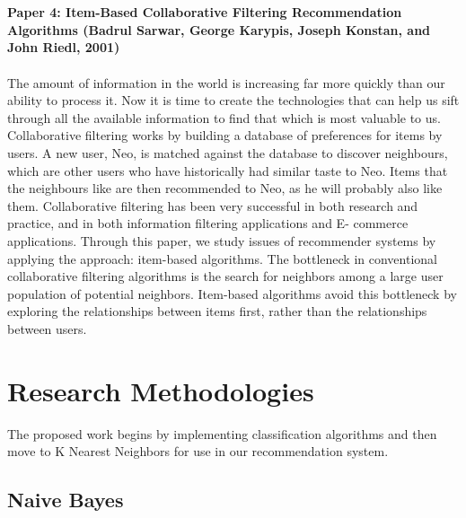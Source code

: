 \documentclass[paper=a4, fontsize=12pt]{scrartcl}
\numberwithin{equation}{section}		%
\numberwithin{figure}{section}			%
\numberwithin{table}{section}				%
\begin{document}
\\
\\
\textbf{Paper 4: Item-Based Collaborative Filtering Recommendation Algorithms (Badrul Sarwar, George Karypis, Joseph Konstan, and John Riedl, 2001)}
\\
\\
The amount of information in the world is increasing far more quickly than our ability to process it.
Now it is time to create the technologies that can help us sift through all the available information to find that which is most valuable to us. Collaborative filtering works by building a database of preferences for items by users. A new user, Neo, is matched against the database to discover neighbours, which are other users who have historically had similar taste to Neo. Items that the neighbours like are then recommended to Neo, as he will probably also like them. Collaborative filtering has been very successful in both research and practice, and in both information filtering applications and E- commerce applications.
Through this paper, we study issues of recommender systems by applying the approach: item-based algorithms. The bottleneck in conventional collaborative filtering algorithms is the search for neighbors among a large user population of potential neighbors. Item-based algorithms avoid this bottleneck by exploring the relationships between items first, rather than the relationships between users.

\section{Research Methodologies}

The proposed work begins by implementing classification algorithms and then move to K Nearest Neighbors for use in our recommendation system.

\subsection{Naive Bayes}
\end{document}
